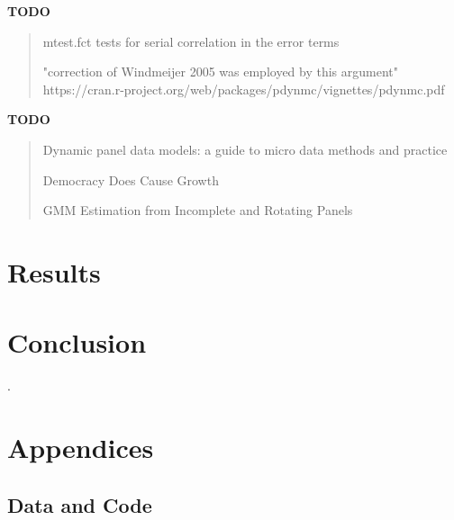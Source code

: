 \documentclass[12pt,a4paper]{article}
\begin{document}
\vspace{1cm}
\noindent\textbf{TODO}
\begin{quote}
mtest.fct tests for serial correlation in the error terms \cite{arellanoTestsSpecificationPanel1991}



"correction of Windmeijer 2005 was employed by this argument" https://cran.r-project.org/web/packages/pdynmc/vignettes/pdynmc.pdf
\end{quote}

\vspace{1cm}
\noindent\textbf{TODO}
\begin{quote}\cite{petrovicUnderlyingCausalFactors2018}
Dynamic panel data models: a guide to micro data methods and practice \cite{bondDynamicPanelData2002}


Democracy Does Cause Growth \cite{acemogluDemocracyDoesCause2019}


GMM Estimation from Incomplete and Rotating Panels \cite{albarranGMMEstimationIncomplete2019}
\end{quote}

\section{Results}\label{sec:results}

\section{Conclusion}\label{sec:conclusion}

\clearpage

\appendix

\renewcommand{\refname}{\section{References}\label{sec:references}}.


\clearpage

\section{Appendices}

\subsection{Data and Code}\label{sec:data_and_code}
\end{document}
